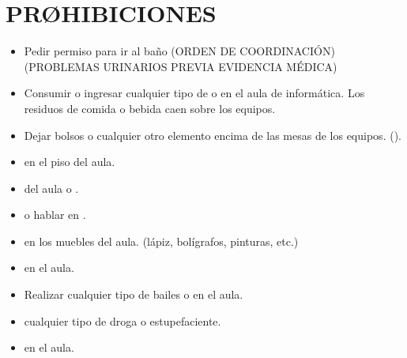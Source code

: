 \documentclass[letterpaper,10pt,spanish]{sphinxmanual}
\begin{document}
\section{PRØHIBICIONES}
\label{\detokenize{reglas:prohibiciones}}\begin{itemize}
\item {} 
\sphinxAtStartPar
Pedir permiso para ir al baño (ORDEN DE COORDINACIÓN) (PROBLEMAS URINARIOS PREVIA EVIDENCIA MÉDICA) 

\item {} 
\sphinxAtStartPar
Consumir o ingresar cualquier tipo de  o  en el aula de informática. Los residuos de comida o bebida caen sobre los equipos.

\item {} 
\sphinxAtStartPar
Dejar bolsos o cualquier otro elemento encima de las mesas de los equipos. ().

\item {} 
\sphinxAtStartPar
{} en el piso del aula.

\item {} 
\sphinxAtStartPar
{} del aula o .

\item {} 
\sphinxAtStartPar
{} o hablar en .

\item {} 
\sphinxAtStartPar
{} en los muebles del aula. (lápiz, bolígrafos, pinturas, etc.)

\item {} 
\sphinxAtStartPar
{} en el aula.

\item {} 
\sphinxAtStartPar
Realizar cualquier tipo de bailes o  en el aula.

\item {} 
\sphinxAtStartPar
{} cualquier tipo de droga o estupefaciente.

\item {} 
\sphinxAtStartPar
{} en el aula.


\end{itemize}
\end{document}
